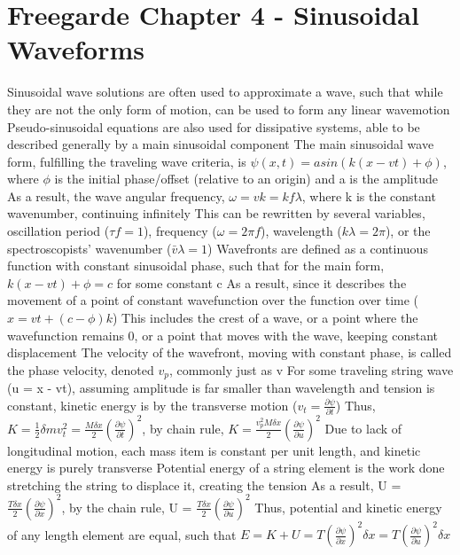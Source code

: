 \documentclass[11 pt, twoside]{article}
\newenvironment{outline*}
{
	\begin{outline}[enumerate]
	}
	{\end{outline}
}
\begin{document}
\section{Freegarde Chapter 4 - Sinusoidal Waveforms}
\begin{outline*}
\1 Sinusoidal wave solutions are often used to approximate a wave, such that while they are not the only form of motion, can be used to form any linear wavemotion
\2 Pseudo-sinusoidal equations are also used for dissipative systems, able to be described generally by a main sinusoidal component
\1 The main sinusoidal wave form, fulfilling the traveling wave criteria, is $\psi(x, t) = asin(k(x - vt) + \phi)$, where $\phi$ is the initial phase/offset (relative to an origin) and a is the amplitude
\2 As a result, the wave angular frequency, $\omega = vk = kf\lambda$, where k is the constant wavenumber, continuing infinitely
\2 This can be rewritten by several variables, oscillation period ($\tau f = 1$), frequency ($\omega = 2\pi f$), wavelength ($k\lambda = 2\pi$), or the spectroscopists' wavenumber ($\bar{v}\lambda = 1$)
\1 Wavefronts are defined as a continuous function with constant sinusoidal phase, such that for the main form, $k(x - vt) + \phi = c$ for some constant c
\2 As a result, since it describes the movement of a point of constant wavefunction over the function over time ($x = vt + (c - \phi)k$)
\2 This includes the crest of a wave, or a point where the wavefunction remains 0, or a point that moves with the wave, keeping constant displacement
\2 The velocity of the wavefront, moving with constant phase, is called the phase velocity, denoted $v_p$, commonly just as v
\1 For some traveling string wave (u = x - vt), assuming amplitude is far smaller than wavelength and tension is constant, kinetic energy is by the transverse motion ($v_t = \frac{\partial \psi}{\partial t}$)
\2 Thus, $K = \frac{1}{2}\delta m v_t^2 = \frac{M \delta x}{2}(\frac{\partial \psi}{\partial t})^2$, by chain rule, $K = \frac{v_p^2M\delta x}{2}(\frac{\partial \psi}{\partial u})^2$
\3 Due to lack of longitudinal motion, each mass item is constant per unit length, and kinetic energy is purely transverse
\2 Potential energy of a string element is the work done stretching the string to displace it, creating the tension
\3 As a result, U = $\frac{T\delta x}{2}(\frac{\partial \psi}{\partial x})^2$, by the chain rule, U = $\frac{T\delta x}{2}(\frac{\partial \psi}{\partial u})^2$
\3 Thus, potential and kinetic energy of any length element are equal, such that $E = K + U = T(\frac{\partial \psi}{\partial x})^2\delta x = T(\frac{\partial \psi}{\partial u})^2\delta x$

\end{outline*}
\end{document}
